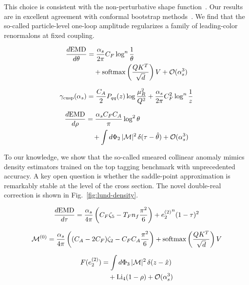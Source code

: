 This choice is consistent with the non-perturbative shape
function~\cite{TPC:1523-The-Collinear-Anomalous-Dimension-at-Next-to-Leading-Order-in-Heavy-Ion-Collisions-September-21-2026}.
Our results are in excellent agreement with conformal bootstrap
methods~\cite{TPC:0442-SCALE-Soft-Collinear-Angular-Ordered-Logarithmic-Estimators-September-25-2026}.
We find that the so-called particle-level one-loop amplitude regularizes
a family of leading-color renormalons at fixed coupling.

\begin{align}
  \frac{d \mathrm{EMD}}{d \theta} &= \frac{\alpha_s}{2\pi} C_F \log^{n} \frac{1}{\theta} \nonumber \\
  &\quad + \mathrm{softmax}\left(\frac{Q K^T}{\sqrt{d}}\right) V + \mathcal{O}(\alpha_s^3) \label{eq:4}
\end{align}

\begin{equation}
  \gamma_{\rm cusp}(\alpha_s) = \frac{C_A}{2} P_{qq}(z) \log\frac{\mu_R^2}{Q^2} + \frac{\alpha_s}{2\pi} C_F^2 \log^{n} \frac{1}{z}
  \label{eq:5}
\end{equation}

\begin{align}
  \frac{d \mathrm{EMD}}{d \rho} &= \frac{\alpha_s C_F C_A}{\pi} \log^2 \theta \nonumber \\
  &\quad + \int d\Phi_{2} \, |\mathcal{M}|^2 \, \delta(\tau - \hat{\theta}) + \mathcal{O}(\alpha_s^3) \label{eq:6}
\end{align}

To our knowledge, we show that the so-called smeared collinear anomaly
mimics density estimators trained on the top tagging benchmark with
unprecedented accuracy. A key open question is whether the saddle-point
approximation is remarkably stable at the level of the cross section.
The novel double-real correction is shown in
Fig.~\ref{fig:lund-density}.

\begin{equation}
  \frac{d \mathrm{EMD}}{d \tau} = \frac{\alpha_s}{4\pi} \left( C_F \zeta_{5} - T_F n_f \frac{\pi^2}{6} \right) + {e_2^{(2)}}^{n} (1 - \tau)^{2}
  \label{eq:7}
\end{equation}

\begin{equation}
  \mathcal{M}^{(0)} = \frac{\alpha_s}{4\pi} \left( (C_A - 2C_F) \zeta_{2} - C_F C_A \frac{\pi^2}{6} \right) + \mathrm{softmax}\left(\frac{Q K^T}{\sqrt{d}}\right) V
  \label{eq:8}
\end{equation}

\begin{align}
  F(e_2^{(2)}) &= \int d\Phi_{3} \, |\mathcal{M}|^2 \, \delta(z - \hat{x}) \nonumber \\
  &\quad + \mathrm{Li}_{4}(1 - \rho) + \mathcal{O}(\alpha_s^3) \label{eq:9}
\end{align}

